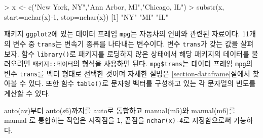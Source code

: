 \documentclass[
]{book}
\newenvironment{Shaded}{\begin{snugshade}}{\end{snugshade}}
\newcommand{\AttributeTok}[1]{\textcolor[rgb]{0.77,0.63,0.00}{#1}}
\newcommand{\DecValTok}[1]{\textcolor[rgb]{0.00,0.00,0.81}{#1}}
\newcommand{\FunctionTok}[1]{\textcolor[rgb]{0.00,0.00,0.00}{#1}}
\newcommand{\NormalTok}[1]{#1}
\newcommand{\OtherTok}[1]{\textcolor[rgb]{0.56,0.35,0.01}{#1}}
\newcommand{\SpecialCharTok}[1]{\textcolor[rgb]{0.00,0.00,0.00}{#1}}
\newcommand{\StringTok}[1]{\textcolor[rgb]{0.31,0.60,0.02}{#1}}
\begin{document}
\begin{Shaded}
\begin{Highlighting}[]
\SpecialCharTok{\textgreater{}}\NormalTok{ x }\OtherTok{\textless{}{-}} \FunctionTok{c}\NormalTok{(}\StringTok{"New York, NY"}\NormalTok{,}\StringTok{"Ann Arbor, MI"}\NormalTok{,}\StringTok{"Chicago, IL"}\NormalTok{)}
\SpecialCharTok{\textgreater{}} \FunctionTok{substr}\NormalTok{(x, }\AttributeTok{start=}\FunctionTok{nchar}\NormalTok{(x)}\SpecialCharTok{{-}}\DecValTok{1}\NormalTok{, }\AttributeTok{stop=}\FunctionTok{nchar}\NormalTok{(x))}
\NormalTok{[}\DecValTok{1}\NormalTok{] }\StringTok{"NY"} \StringTok{"MI"} \StringTok{"IL"}
\end{Highlighting}
\end{Shaded}

패키지 \texttt{ggplot2}에 있는 데이터 프레임 \texttt{mpg}는 자동차의 연비와 관련된 자료이다. 11개의
변수 중 \texttt{trans}는 변속기 종류를 나타내는 변수이다. 변수 \texttt{trans}가 갖는 값을 살펴보자. 함수 \texttt{library()}로 패키지를 로딩하지 않은 상태에서 해당 패키지의 데이터를 불러오려면
\texttt{패키지::데이터}의 형식을 사용하면 된다. \texttt{mpg\$trans}는 데이터 프레임 \texttt{mpg}의 변수 \texttt{trans}를 벡터 형태로 선택한 것이며 자세한 설명은 \ref{section-dataframe}절에서 찾아볼 수 있다.
또한 함수 \texttt{table()}로 문자형 벡터를 구성하고 있는 각 문자열의 빈도를 계산할 수 있다.

\begin{Shaded}
\end{Shaded}

auto(av)부터 auto(s6)까지를 auto로 통합하고 manual(m5)와 manual(m6)를 manual
로 통합하는 작업은 시작점을 \texttt{1}, 끝점을 \texttt{nchar(x)-4}로 지정함으로써 가능하다.
\end{document}
